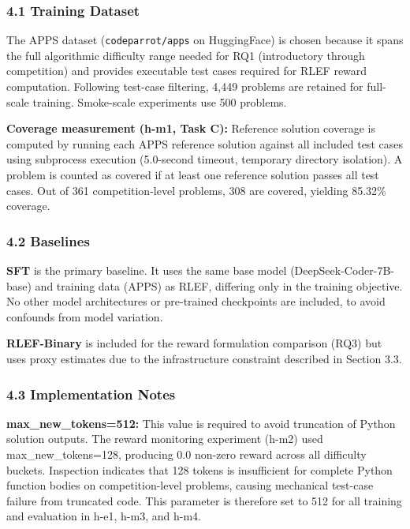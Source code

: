 
\subsubsection{4.1 Training Dataset}

The APPS dataset (\texttt{codeparrot/apps} on HuggingFace) is chosen because it spans the full algorithmic difficulty range needed for RQ1 (introductory through competition) and provides executable test cases required for RLEF reward computation. Following test-case filtering, 4,449 problems are retained for full-scale training. Smoke-scale experiments use 500 problems.

\textbf{Coverage measurement (h-m1, Task C):} Reference solution coverage is computed by running each APPS reference solution against all included test cases using subprocess execution (5.0-second timeout, temporary directory isolation). A problem is counted as covered if at least one reference solution passes all test cases. Out of 361 competition-level problems, 308 are covered, yielding 85.32\% coverage.

\subsubsection{4.2 Baselines}

\textbf{SFT} is the primary baseline. It uses the same base model (DeepSeek-Coder-7B-base) and training data (APPS) as RLEF, differing only in the training objective. No other model architectures or pre-trained checkpoints are included, to avoid confounds from model variation.

\textbf{RLEF-Binary} is included for the reward formulation comparison (RQ3) but uses proxy estimates due to the infrastructure constraint described in Section 3.3.

\subsubsection{4.3 Implementation Notes}

\textbf{max\_new\_tokens=512:} This value is required to avoid truncation of Python solution outputs. The reward monitoring experiment (h-m2) used max\_new\_tokens=128, producing 0.0 non-zero reward across all difficulty buckets. Inspection indicates that 128 tokens is insufficient for complete Python function bodies on competition-level problems, causing mechanical test-case failure from truncated code. This parameter is therefore set to 512 for all training and evaluation in h-e1, h-m3, and h-m4.

